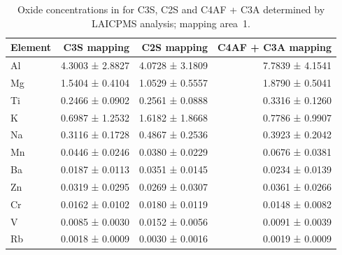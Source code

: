 \begin{table}[!htb]
	\caption{
		Oxide concentrations in \unit{\wtpercent} for \ac{C3S}, \ac{C2S} and \ac{C4AF} + \ac{C3A} determined by \ac{LAICPMS} analysis; mapping area~1.
	}
	\label{tab:laicpms2-area1}
	\begin{tabular*}{\linewidth}{@{\extracolsep{\fill}} lrrr}
	\toprule
	Element & \ac{C3S}   mapping  & \ac{C2S}   mapping  & \ac{C4AF} + \ac{C3A} mapping \\ \midrule
	Al      & 4.3003 ± 2.8827 & 4.0728 ± 3.1809 & 7.7839 ± 4.1541       \\
	Mg      & 1.5404 ± 0.4104 & 1.0529 ± 0.5557 & 1.8790 ± 0.5041       \\
	Ti      & 0.2466 ± 0.0902 & 0.2561 ± 0.0888 & 0.3316 ± 0.1260       \\
	K       & 0.6987 ± 1.2532 & 1.6182 ± 1.8668 & 0.7786 ± 0.9907       \\
	Na      & 0.3116 ± 0.1728 & 0.4867 ± 0.2536 & 0.3923 ± 0.2042       \\
	Mn      & 0.0446 ± 0.0246 & 0.0380 ± 0.0229 & 0.0676 ± 0.0381       \\
	Ba      & 0.0187 ± 0.0113 & 0.0351 ± 0.0145 & 0.0234 ± 0.0139       \\
	Zn      & 0.0319 ± 0.0295 & 0.0269 ± 0.0307 & 0.0361 ± 0.0266       \\
	Cr      & 0.0162 ± 0.0102 & 0.0180 ± 0.0119 & 0.0148 ± 0.0082       \\
	V       & 0.0085 ± 0.0030 & 0.0152 ± 0.0056 & 0.0091 ± 0.0039       \\
	Rb      & 0.0018 ± 0.0009 & 0.0030 ± 0.0016 & 0.0019 ± 0.0009       \\ \bottomrule 
	\end{tabular*}
\end{table}

